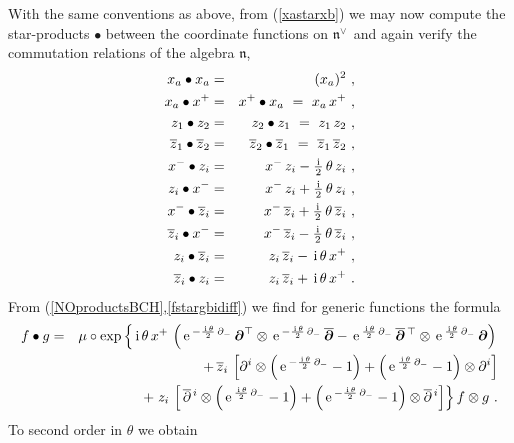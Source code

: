 \documentclass[11pt,a4paper]{article}
\newcommand{\1}{\mathbb{1}}
\newcommand{\mbf}[1]{{\boldsymbol {#1} }}
\def\ii{{\,{\rm i}\,}}
\def\mdell{{\mbf\partial}}
\def\mfn{{\mathfrak n}}
\def\e{{\,\rm e}\,}
\def\bea{\begin{eqnarray}}
\def\eea{\end{eqnarray}}
\newcommand{\z}{\zeta}
\begin{document}
With the same conventions as above, from (\ref{xastarxb}) we may now
compute the star-products $\bullet$ between the coordinate functions
on $\mfn^{\vee\,}$ and again verify the commutation relations of the
algebra $\mfn$,
\bea
x_a\bullet x_a&=&(x_a)^2 \ , \nonumber\\
x_a\bullet x^+&=&x^+\bullet x_a~=~x_a\,x^+ \ ,
\nonumber\\z_1\bullet z_2&=&z_2\bullet z_1
{}~=~z_1\,z_2 \ ,\nonumber\\\overline{z}_1\bullet \overline{z}_2
&=&\overline{z}_2\bullet \overline{z}_1
{}~=~\overline{z}_1\,\overline{z}_2 \ , \nonumber\\
x^-\bullet z_i&=&x^-\,z_i-\mbox{$\frac\ii2$}\,
\theta\,z_i \ , \nonumber\\
z_i\bullet x^-&=&x^-\,z_i+\mbox{$\frac\ii2$}\,
\theta\,z_i \ , \nonumber\\x^-\bullet \overline{z}_i
&=&x^-\,\overline{z}_i+\mbox{$\frac\ii2$}\,
\theta\,\overline{z}_i \ , \nonumber\\\overline{z}_i\bullet x^-
&=&x^-\,\overline{z}_i-\mbox{$\frac\ii2$}\,
\theta\,\overline{z}_i \ , \nonumber\\
z_i\bullet \overline{z}_i&=&z_i\,\overline{z}_i-\ii\theta\,x^+ \ ,
\nonumber\\ \overline{z}_i\bullet z_i &=&z_i\,\overline{z}_i+
\ii\theta\,x^+  \ .
\label{TOsymcoordstarprods}\eea
{}From (\ref{NOproductsBCH},\ref{fstargbidiff}) we find for generic
functions the formula
\bea
f\bullet g&=&\mu\circ\exp\left\{\ii\theta\,x^+\,\left(\e^{-\frac{\ii\theta}2
\,\partial_-}\,
\mdell^\top\otimes\e^{-\frac{\ii\theta}2\,\partial_-}\,
\overline{\mdell}-\e^{\frac{\ii\theta}2\,\partial_-}\,
\overline{\mdell}{}^{\,\top}\otimes\e^{\frac{\ii\theta}2\,\partial_-}\,
\mdell\right)\right.\nonumber
\\ &&\qquad\qquad+\,\overline{z}_i\,\left[\partial^i\otimes
\left(\e^{-\frac{\ii\theta}2\,\partial_-}-1\right)
+\left(\e^{\frac{\ii\theta}2\,\partial_-}-1\right)\otimes
\partial^i\right]\nonumber\\ &&\qquad\qquad+\left.
z_i\,\left[\,\overline{\partial}{}^{\,i}\otimes
\left(\e^{\frac{\ii\theta}2\,\partial_-}-1\right)
+\left(\e^{-\frac{\ii\theta}2\,\partial_-}-1\right)
\otimes\overline{\partial}{}^{\,i}\right]\right\}f\otimes g \ .
\label{TOsymstargen}\eea
To second order in $\theta$ we obtain
\end{document}
